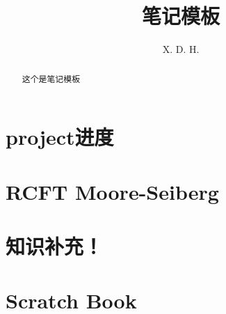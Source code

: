 \documentclass[12pt]{report}
\begin{document}
\title{\boldmath 笔记模板}
\author{X. D. H.}

\maketitle

\begin{abstract}
这个是笔记模板
\end{abstract}

\tableofcontents

\chapter{project进度}


\chapter{RCFT Moore-Seiberg}


\chapter{知识补充！}


\chapter{Scratch Book}

\end{document}
